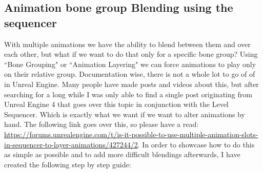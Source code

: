 \documentclass{uva-inf-article}
\begin{document}
\subsection{Animation bone group Blending using the sequencer}\label{sec:bonegrouping}
With multiple animations we have the ability to blend between them and over each other, but what if we want to do that only for a specific bone group? Using ``Bone Grouping" or ``Animation Layering" we can force animations to play only on their relative group. Documentation wise, there is not a whole lot to go of of in Unreal Engine. Many people have made posts and videos about this, but after searching for a long while I was only able to find a single post originating from Unreal Engine 4 that goes over this topic in conjunction with the Level Sequencer. Which is exactly what we want if we want to alter animations by hand. The following link goes over this, so please have a read: \url{https://forums.unrealengine.com/t/is-it-possible-to-use-multiple-animation-slots-in-sequencer-to-layer-animations/427244/2}. In order to showcase how to do this as simple as possible and to add more difficult blendings afterwards, I have created the following step by step guide:
\end{document}
